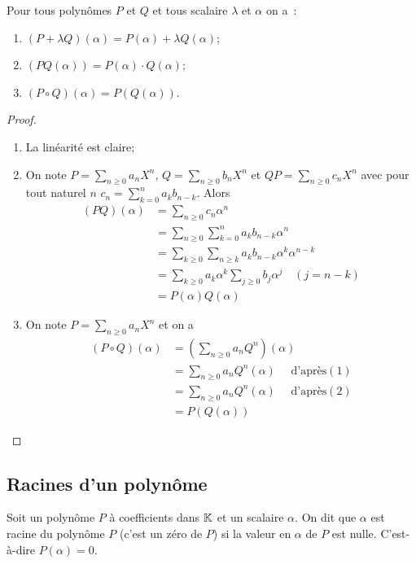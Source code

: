 \begin{prop}
  Pour tous polynômes $P$ et $Q$ et tous scalaire $\lambda$ et $\alpha$ on a~:
  \begin{enumerate}
  \item $(P+\lambda Q)(\alpha)=P(\alpha) + \lambda Q(\alpha)$;
  \item $(PQ(\alpha))=P(\alpha) \cdot Q(\alpha)$;
  \item $(P \circ Q)(\alpha) = P(Q(\alpha))$.
  \end{enumerate}
\end{prop}
\begin{proof}
  \begin{enumerate}
  \item La linéarité est claire;
  \item On note $P=\sum_{n \geq 0}a_n X^n$, $Q=\sum_{n \geq 0}b_n X^n$ et $QP=\sum_{n \geq 0}c_n X^n$ avec pour tout naturel $n$ $c_n = \sum_{k=0}^n a_kb_{n-k}$. Alors
    \begin{align}
      (PQ)(\alpha)&=\sum_{n \geq 0}c_n \alpha^n \\
      &=\sum_{n \geq 0} \sum_{k=0}^n a_k b_{n-k} \alpha^n\\
      &=\sum_{k \geq 0} \sum_{n \geq k} a_k b_{n-k} \alpha^k \alpha^{n-k}\\
      &=\sum_{k \geq 0}  a_k  \alpha^k \sum_{j \geq 0} b_j \alpha^j \quad (j=n-k)\\
      &=P(\alpha) Q(\alpha)
    \end{align}
  \item On note $P=\sum_{n \geq 0}a_n X^n$ et on a
    \begin{align}
      (P \circ Q)(\alpha) &= \left(\sum_{n \geq 0} a_n Q^n \right)(\alpha)\\
      &= \sum_{n \geq 0} a_n Q^n(\alpha) \quad \text{~d'après} (1)\\
      &= \sum_{n \geq 0} a_n Q^n(\alpha) \quad \text{~d'après} (2)\\
      &= P(Q(\alpha))
    \end{align}
  \end{enumerate}
\end{proof}

\subsection{Racines d'un polynôme}

\begin{defdef}
  Soit un polynôme $P$ à coefficients dans $\mathbb{K}$ et un scalaire $\alpha$. On dit que $\alpha$ est racine du polynôme  $P$ (c'est un zéro de $P$) si la valeur en $\alpha$ de $P$ est nulle. C'est-à-dire $P(\alpha)=0$.
\end{defdef}

